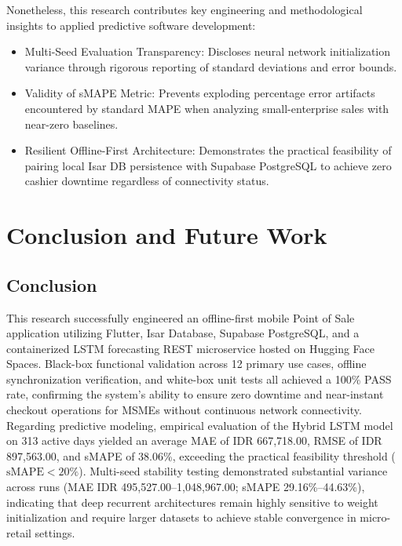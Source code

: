 \documentclass[10pt,a4paper]{article}
\begin{document}
Nonetheless, this research contributes key engineering and methodological insights to applied predictive software development:
\begin{itemize}
  \item Multi-Seed Evaluation Transparency: Discloses neural network initialization variance through rigorous reporting of standard deviations and error bounds.
  \item Validity of sMAPE Metric: Prevents exploding percentage error artifacts encountered by standard MAPE when analyzing small-enterprise sales with near-zero baselines.
  \item Resilient Offline-First Architecture: Demonstrates the practical feasibility of pairing local Isar DB persistence with Supabase PostgreSQL to achieve zero cashier downtime regardless of connectivity status.
\end{itemize}

\FloatBarrier
\section{Conclusion and Future Work}

\subsection{Conclusion}
This research successfully engineered an offline-first mobile Point of Sale application utilizing Flutter, Isar Database, Supabase PostgreSQL, and a containerized LSTM forecasting REST microservice hosted on Hugging Face Spaces. Black-box functional validation across 12 primary use cases, offline synchronization verification, and white-box unit tests all achieved a 100\% PASS rate, confirming the system's ability to ensure zero downtime and near-instant checkout operations for MSMEs without continuous network connectivity. Regarding predictive modeling, empirical evaluation of the Hybrid LSTM model on 313 active days yielded an average MAE of IDR 667,718.00, RMSE of IDR 897,563.00, and sMAPE of 38.06\%, exceeding the practical feasibility threshold ($\text{sMAPE} < 20\%$). Multi-seed stability testing demonstrated substantial variance across runs (MAE IDR 495,527.00--1,048,967.00; sMAPE 29.16\%--44.63\%), indicating that deep recurrent architectures remain highly sensitive to weight initialization and require larger datasets to achieve stable convergence in micro-retail settings.
\end{document}
